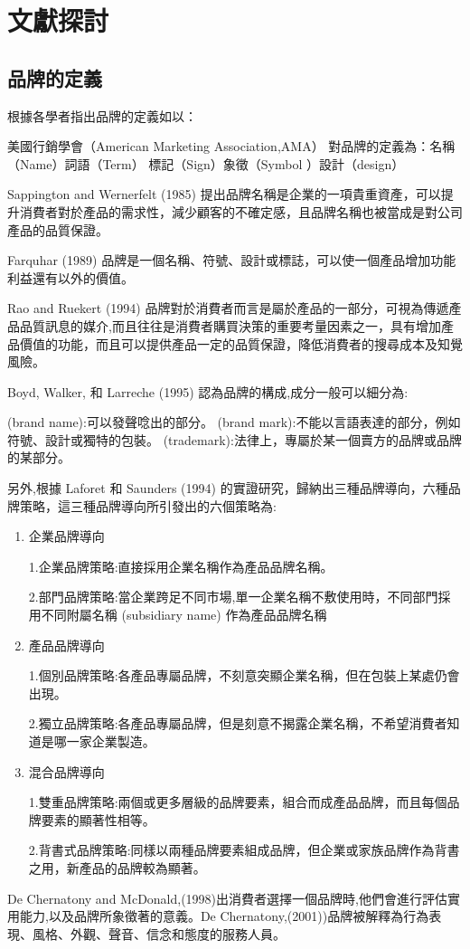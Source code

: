 \chapter{文獻探討}


\section{品牌的定義}

根據各學者指出品牌的定義如以：

美國行銷學會（American Marketing Association,AMA）
對品牌的定義為：名稱 （Name）詞語（Term） 標記（Sign）象徵（Symbol ）設計（design）\cite{AMA}

Sappington and Wernerfelt (1985) \cite{Sappington}提出品牌名稱是企業的一項貴重資產，可以提升消費者對於產品的需求性，減少顧客的不確定感，且品牌名稱也被當成是對公司產品的品質保證。

Farquhar (1989) \cite{Farquhar}品牌是一個名稱、符號、設計或標誌，可以使一個產品增加功能利益還有以外的價值。



Rao and Ruekert (1994) \cite{Rao}品牌對於消費者而言是屬於產品的一部分，可視為傳遞產品品質訊息的媒介,而且往往是消費者購買決策的重要考量因素之一，具有增加產品價值的功能，而且可以提供產品一定的品質保證，降低消費者的搜尋成本及知覺風險。

Boyd, Walker, 和 Larreche (1995)\cite{Boyd} 認為品牌的構成,成分一般可以細分為:
\begin{enumerate}
(brand name):可以發聲唸出的部分。
(brand mark):不能以言語表達的部分，例如符號、設計或獨特的包裝。 
(trademark):法律上，專屬於某一個賣方的品牌或品牌的某部分。
\end{enumerate}

另外,根據 Laforet 和 Saunders (1994)\cite{Laforet} 的實證研究，歸納出三種品牌導向，六種品牌策略，這三種品牌導向所引發出的六個策略為:
\begin{enumerate}
\item 企業品牌導向

1.企業品牌策略:直接採用企業名稱作為產品品牌名稱。 

2.部門品牌策略:當企業跨足不同市場,單一企業名稱不敷使用時，不同部門採用不同附屬名稱 (subsidiary name) 作為產品品牌名稱
\item 產品品牌導向

1.個別品牌策略:各產品專屬品牌，不刻意突顯企業名稱，但在包裝上某處仍會出現。

2.獨立品牌策略:各產品專屬品牌，但是刻意不揭露企業名稱，不希望消費者知道是哪一家企業製造。
\item 混合品牌導向

1.雙重品牌策略:兩個或更多層級的品牌要素，組合而成產品品牌，而且每個品牌要素的顯著性相等。

2.背書式品牌策略:同樣以兩種品牌要素組成品牌，但企業或家族品牌作為背書之用，新產品的品牌較為顯著。
\end{enumerate}
De Chernatony and McDonald,(1998)\cite{Chernatony1998}出消費者選擇一個品牌時,他們會進行評估實用能力,以及品牌所象徵著的意義。De Chernatony,(2001))\cite{Chernatony2001}品牌被解釋為行為表現、風格、外觀、聲音、信念和態度的服務人員。

